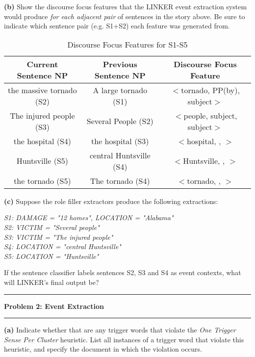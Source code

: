 \documentclass[11pt]{article}
\newcommand\question[2]{\vspace{.25in}\hrule\textbf{#1: #2}\vspace{.5em}\hrule\vspace{.10in}}
\renewcommand\part[1]{\vspace{.10in}\textbf{(#1)}}
\begin{document}
\part{b} Show the discourse focus features that the LINKER event extraction system would produce \textit{for each adjacent pair} of sentences in the story above. Be sure to indicate which sentence pair (e.g. S1+S2) each feature was generated from.

 \begin{table}[H]
\centering
{\renewcommand{\arraystretch}{1.2}%
\begin{tabular}{| c | c | c |}
\hline
\textbf{Current Sentence NP} & \textbf{Previous Sentence NP} & \textbf{Discourse Focus Feature}\\
\hline
the massive tornado (S2)&  A large tornado (S1)& $<$tornado, PP(by), subject$>$ \\ \hline
The injured people (S3)&  Several People (S2)& $<$people, subject, subject$>$ \\ \hline
the hospital (S4)&  the hospital (S3)& $<$hospital, , $>$ \\ \hline
Huntsville (S5)&  central Huntsville (S4)& $<$Huntsville, , $>$ \\ \hline
the tornado (S5)&  The tornado (S4)& $<$tornado, , $>$ \\ \hline
\end{tabular}}
\caption{Discourse Focus Features for S1-S5}
\end{table}

\part{c} Suppose the role filler extractors produce the following extractions:

\textit{S1: DAMAGE = "12 homes", LOCATION = "Alabama" \\
S2: VICTIM = "Several people" \\
S3: VICTIM = "The injured people" \\
S4: LOCATION = "central Huntsville" \\
S5: LOCATION = "Huntsville"} \newline

If the sentence classifier labels sentences S2, S3 and S4 as event contexts, what will LINKER's final output be?

\question{Problem 2}{Event Extraction}


\part{a} Indicate whether that are any trigger words that violate the \textit{One Trigger Sense Per Cluster} heuristic. List all instances of a trigger word that violate this heuristic, and specify the document in which the violation occurs.
\end{document}

